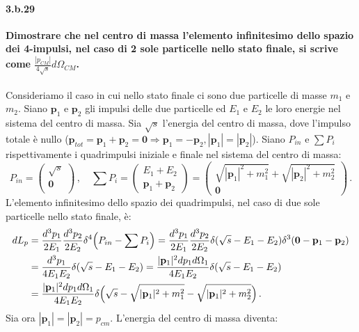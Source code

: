 \documentclass[twoside]{article}
\begin{document}
\paragraph{3.b.29}\textbf{Dimostrare che nel centro di massa l’elemento infinitesimo dello spazio dei 4-impulsi, nel caso di 2 sole particelle nello stato finale, si scrive come $\frac{|p_{CM}|}{4\sqrt{s}}d\Omega_{CM}$.}\\ \\
Consideriamo il caso in cui nello stato finale ci sono due particelle di masse $m_1$ e $m_2$. Siano $\mathbf{p}_1$ e $\mathbf{p}_2$ gli impulsi delle due particelle ed $E_1$ e $E_2$ le loro energie nel sistema del centro di massa. Sia $\sqrt{s}$ l'energia del centro di massa, dove l'impulso totale è nullo ($\mathbf{p}_{tot}=\mathbf{p}_1+\mathbf{p}_2=\mathbf{0} \Rightarrow \mathbf{p}_1=-\mathbf{p}_2, |\mathbf{p}_1|=|\mathbf{p}_2|$). Siano $P_{in}$ e $\sum P_i$ rispettivamente i quadrimpulsi iniziale e finale nel sistema del centro di massa:
\begin{equation*}
P_{in}=
\begin{pmatrix}
\sqrt{s} \\
\mathbf{0} \\
\end{pmatrix} \, ,
\quad
\sum P_i=
\begin{pmatrix}
E_1+E_2 \\
\mathbf{p}_1+\mathbf{p}_2
\end{pmatrix}
=
\begin{pmatrix}
\sqrt{|\mathbf{p}_1|^2+m_1^2}+\sqrt{|\mathbf{p}_2|^2+m_2^2} \\
\mathbf{0}
\end{pmatrix} \,.
\end{equation*}
L'elemento infinitesimo dello spazio dei quadrimpulsi, nel caso di due sole particelle nello stato finale, è:
\begin{align}
dL_p&=\frac{d^3p_1}{2E_1}\frac{d^3p_2}{2E_2} \delta^4 \Bigl( P_{in}-\sum P_i \Bigr)=\frac{d^3p_1}{2E_1}\frac{d^3p_2}{2E_2} \delta(\sqrt{s}-E_1-E_2) \delta^3(\mathbf{0}-\mathbf{p}_1-\mathbf{p}_2) \\
&=\frac{d^3p_1}{4E_1E_2}\delta(\sqrt{s}-E_1-E_2)=\frac{|\mathbf{p}_1|^2dp_1d\Omega_1}{4E_1E_2} \delta(\sqrt{s}-E_1-E_2) \\
&=\frac{|\mathbf{p}_1|^2dp_1d\Omega_1}{4E_1E_2} \delta \Bigl(\sqrt{s}-\sqrt{|\mathbf{p}_1|^2+m_1^2}-\sqrt{|\mathbf{p}_1|^2+m_2^2} \Bigr) \, .
\end{align}
Sia ora $|\mathbf{p}_1|=|\mathbf{p}_2|=p_{cm}$. L'energia del centro di massa diventa:
\end{document}
